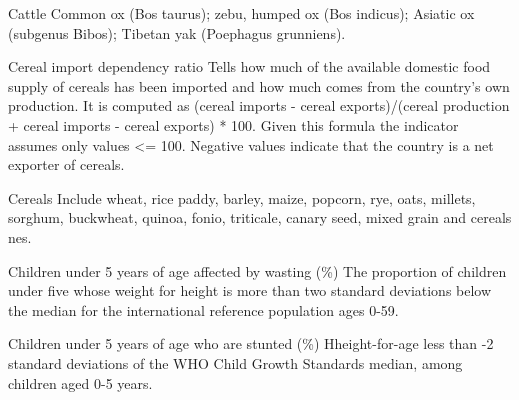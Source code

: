 \begin{MetadataCollection} {}
\begin{metadata}{Cattle} {}
Common ox (Bos taurus); zebu, humped ox (Bos indicus); Asiatic ox (subgenus Bibos); Tibetan yak (Poephagus grunniens).
\end{metadata}

\begin{metadata}{Cereal import dependency ratio} {}
Tells how much of the available domestic food supply of cereals has been imported and how much comes from the country's own production. It is computed as (cereal imports - cereal exports)/(cereal production + cereal imports - cereal exports) * 100. Given this formula the indicator assumes only values <= 100. Negative values indicate that the country is a net exporter of cereals.
\end{metadata}

\begin{metadata}{Cereals} {}
Include wheat, rice paddy, barley, maize, popcorn, rye, oats, millets, sorghum, buckwheat, quinoa, fonio, triticale, canary seed, mixed grain and cereals nes.
\end{metadata}

\begin{metadata}{Children under 5 years of age affected by wasting (\%)} {}
The proportion of children under five whose weight for height is more than two standard deviations below the median for the international reference population ages 0-59.
\end{metadata}

\begin{metadata}{Children under 5 years of age who are stunted (\%)} {}
Hheight-for-age less than -2 standard deviations of the WHO Child Growth Standards median, among children aged 0-5 years.
\end{metadata}


\end{MetadataCollection}

